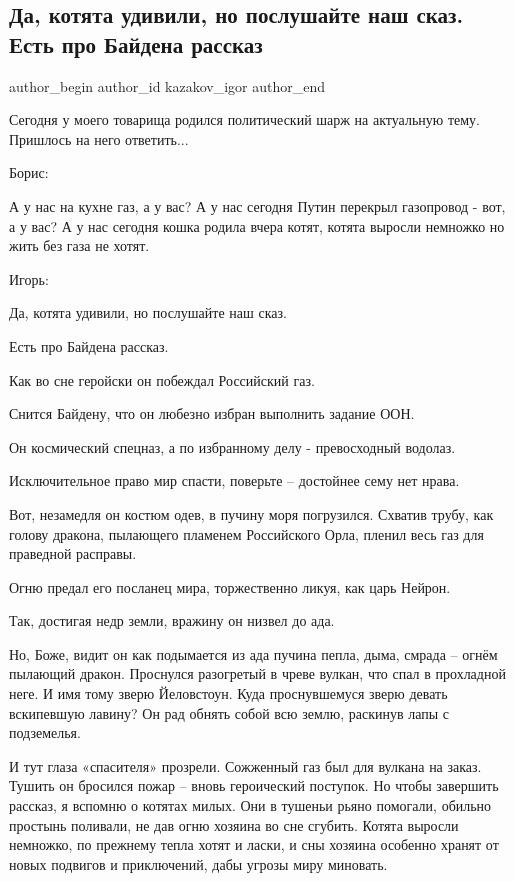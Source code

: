  
 
 
 
 
 
\subsection{Да, котята удивили, но послушайте наш сказ. Есть про Байдена рассказ}
\label{sec:15_10_2021.fb.kazakov_igor.1.kotjata_bajden_rasskaz}
 
\ifcmt
 author_begin
   author_id kazakov_igor
 author_end
\fi

Сегодня у моего товарища родился политический шарж на актуальную тему. Пришлось
на него ответить...

Борис:

А у нас на кухне газ, а у вас? А у нас сегодня Путин перекрыл газопровод - вот,
а у вас? А у нас сегодня кошка родила вчера котят, котята выросли немножко но
жить без газа не хотят.

Игорь:

Да, котята удивили, но послушайте наш сказ.

Есть про Байдена рассказ.

Как во сне геройски он побеждал Российский газ.

Снится Байдену, что он любезно избран выполнить задание ООН.

Он космический спецназ, а по избранному делу - превосходный водолаз. 

Исключительное право мир спасти, поверьте – достойнее сему нет нрава. 

Вот, незамедля он костюм одев, в пучину моря погрузился. Схватив трубу, как
голову дракона, пылающего пламенем Российского Орла, пленил весь газ для
праведной расправы. 

Огню предал его посланец мира, торжественно ликуя, как царь Нейрон. 

Так, достигая недр земли, вражину он низвел до ада. 

Но, Боже, видит он как подымается из ада пучина пепла, дыма, смрада – огнём
пылающий дракон. Проснулся разогретый в чреве вулкан, что спал в прохладной
неге. И имя тому зверю Йеловстоун. Куда проснувшемуся зверю девать вскипевшую
лавину? Он рад обнять собой всю землю, раскинув лапы с подземелья. 

И тут глаза «спасителя» прозрели. Сожженный газ был для вулкана на заказ.
Тушить он бросился пожар – вновь героический поступок. Но чтобы завершить
рассказ, я вспомню о котятах милых. Они в тушеньи рьяно помогали, обильно
простынь поливали, не дав огню хозяина во сне сгубить. Котята выросли немножко,
по прежнему тепла хотят и ласки, и сны хозяина особенно хранят от новых
подвигов и приключений, дабы угрозы миру миновать.
